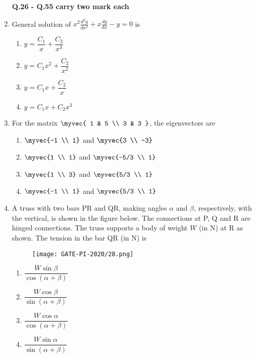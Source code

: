 \documentclass[journal,12pt,onecolumn]{IEEEtran}
\theoremstyle{remark}
\begin{document}
\begin{enumerate}
\textbf{\large Q.26 - Q.55 carry two mark each}\\
\vspace{1cm}
\item General solution of $\displaystyle x^2 \frac{d^2y}{dx^2} + x \frac{dy}{dx} - y = 0$ is
\begin{enumerate}
    \item $y = \dfrac{C_1}{x} + \dfrac{C_2}{x^3}$
    \item $y = C_1 x^2 + \dfrac{C_2}{x^2}$
    \item $y = C_1 x + \dfrac{C_2}{x}$
    \item $y = C_1 x + C_2 x^3$
\end{enumerate}
\vspace{1cm}

\item For the matrix $\myvec{ 1 & 5 \\ 3 & 3 }$, the eigenvectors are
\begin{multicols}{2}
\begin{enumerate}
    \item $\myvec{-1 \\ 1}$ and $\myvec{3 \\ -3}$
    \item $\myvec{1 \\ 1}$ and $\myvec{-5/3 \\ 1}$
    \item $\myvec{1 \\ 3}$ and $\myvec{5/3 \\ 1}$
    \item $\myvec{-1 \\ 1}$ and $\myvec{5/3 \\ 1}$
\end{enumerate}
\end{multicols}
\vspace{1cm}

\newpage
\item A truss with two bars PR and QR, making angles $\alpha$ and $\beta$, respectively, with the vertical, is shown in the figure below. The connections at P, Q and R are hinged connections. The truss supports a body of weight $W$ (in N) at R as shown. The tension in the bar QR (in N) is
\begin{figure}[H]
    \centering
    \texttt{[image: GATE-PI-2020/28.png]} 
    \caption{}
    \label{28}
\end{figure}
\begin{enumerate}
    \item $\dfrac{W \sin{\beta}}{\cos{(\alpha + \beta)}}$
    \item $\dfrac{W \cos{\beta}}{\sin{(\alpha + \beta)}}$
    \item $\dfrac{W \cos{\alpha}}{\cos{(\alpha + \beta)}}$
    \item $\dfrac{W \sin{\alpha}}{\sin{(\alpha + \beta)}}$
\end{enumerate}
\vspace{1cm}


\end{enumerate}
\end{document}
